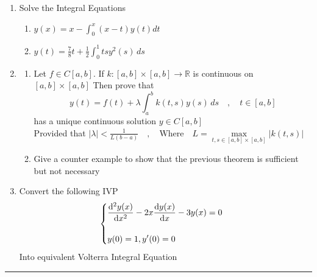 \documentclass[]{article}
\begin{document}
\begin{enumerate}
    \item Solve the Integral Equations
          \vspace*{.2cm}
          \begin{enumerate}
              \item $\displaystyle  y(x)=x-\int_{0}^{x} (x-t) y(t)dt $
                    \vspace*{.1cm}
              \item  $\displaystyle y(t)=\frac{7}{8}t+\frac{1}{2} \int_0^1 ts y^2(s) \,ds$
          \end{enumerate}
          \vspace*{.4cm}
    \item

          \begin{enumerate}
              \item Let $\displaystyle f \in C[a,b]$. If $k:[a,b]\times[a,b] \rightarrow \mathbb{R}$ is continuous on $[a,b]\times[a,b]$ Then prove that
                    \[
                        y(t) = f(t) + \lambda \int_a^b k(t,s) y(s) \,ds \quad,\quad t\in[a,b]
                    \]
                    has a unique continuous solution $y\in C[a,b]$\\
                    Provided that
                    \(
                    \displaystyle |\lambda|< \frac{1}{L(b-a)} \quad,\quad \text{Where}\quad L= \max\limits_{t,s\in [a,b]\times[a,b]} |k(t,s)|
                    \)
                    \vspace*{.1cm}
              \item Give a counter example to show that the previous theorem is sufficient but not necessary
          \end{enumerate}
          \vspace*{.4cm}
    \item Convert the following IVP\\
          \[
              \begin{cases}
                  \displaystyle \dv[2]{y(x)}{x} -2x \dv{y(x)}{x} -3y(x) =0 \\\\
                  \displaystyle y(0) =1 , y'(0)=0                          \\
              \end{cases}
          \]
          Into equivalent Volterra Integral Equation
\end{enumerate}
\vspace*{\fill}
\hrule
\end{document}
